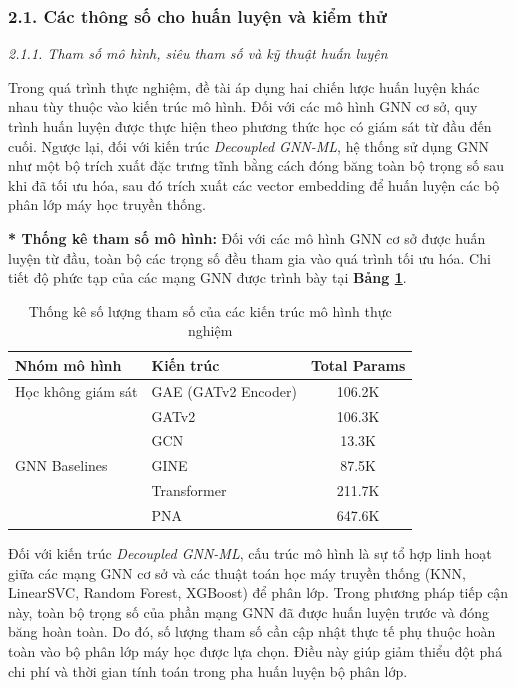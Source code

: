 \subsubsection{2.1. Các thông số cho huấn luyện và kiểm thử}

\textit{2.1.1. Tham số mô hình, siêu tham số và kỹ thuật huấn luyện}\vspace{0.2cm}

\indent Trong quá trình thực nghiệm, đề tài áp dụng hai chiến lược huấn luyện khác nhau tùy thuộc vào kiến trúc mô hình. Đối với các mô hình GNN cơ sở, quy trình huấn luyện được thực hiện theo phương thức học có giám sát từ đầu đến cuối. Ngược lại, đối với kiến trúc \textit{Decoupled GNN-ML}, hệ thống sử dụng GNN như một bộ trích xuất đặc trưng tĩnh bằng cách đóng băng toàn bộ trọng số sau khi đã tối ưu hóa, sau đó trích xuất các vector embedding để huấn luyện các bộ phân lớp máy học truyền thống.\vspace{0.3cm}

\textbf{* Thống kê tham số mô hình:}
Đối với các mô hình GNN cơ sở được huấn luyện từ đầu, toàn bộ các trọng số đều tham gia vào quá trình tối ưu hóa. Chi tiết độ phức tạp của các mạng GNN được trình bày tại \textbf{Bảng \ref{tab:ModelParamsComp}}.

\begin{table}[H]
    \centering
    \caption{Thống kê số lượng tham số của các kiến trúc mô hình thực nghiệm}
    \label{tab:ModelParamsComp}
    \renewcommand{\arraystretch}{1.2}
    \setlength{\tabcolsep}{15pt}
    \begin{tabular}{llc}
        \hline
        \textbf{Nhóm mô hình} & \textbf{Kiến trúc} & \textbf{Total Params} \\
        \hline
        Học không giám sát & GAE (GATv2 Encoder) & 106.2K \\
        \hline
        \multirow{5}{*}{GNN Baselines} 
        & GATv2 & 106.3K \\
        & GCN & 13.3K \\
        & GINE & 87.5K \\
        & Transformer & 211.7K \\
        & PNA & 647.6K \\
        \hline
    \end{tabular}
\end{table}

Đối với kiến trúc \textit{Decoupled GNN-ML}, cấu trúc mô hình là sự tổ hợp linh hoạt giữa các mạng GNN cơ sở và các thuật toán học máy truyền thống (KNN, LinearSVC, Random Forest, XGBoost) để phân lớp. Trong phương pháp tiếp cận này, toàn bộ trọng số của phần mạng GNN đã được huấn luyện trước và đóng băng hoàn toàn. Do đó, số lượng tham số cần cập nhật thực tế phụ thuộc hoàn toàn vào bộ phân lớp máy học được lựa chọn. Điều này giúp giảm thiểu đột phá chi phí và thời gian tính toán trong pha huấn luyện bộ phân lớp.\vspace{0.3cm}

